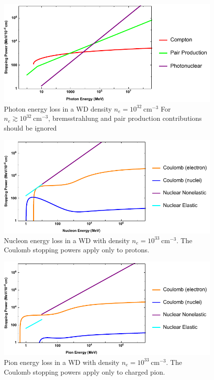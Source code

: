 \documentclass[twocolumn,showpacs,preprintnumbers,amsmath,amssymb,prd]{revtex4}
\begin{document}
\begin{appendices}
\begin{figure}
\label{fig:SPelectron}
\end{figure}
\begin{figure}
\includegraphics[scale=.45]{SPphoton.pdf}
\caption{Photon energy loss in a WD density $n_e = 10^{32} ~\text{cm}^{-3}$ For $n_e \gtrsim 10^{32} ~\text{cm}^{-3}$, bremsstrahlung and pair production contributions should be ignored}
\label{fig:SPphoton}
\end{figure}
\begin{figure}
\includegraphics[scale=.45]{SPnucleon.pdf}
\caption{Nucleon energy loss in a WD with density $n_e = 10^{33} ~\text{cm}^{-3}$. The Coulomb stopping powers apply only to protons.}
\label{fig:SPnuc}
\end{figure}
\begin{figure}
\includegraphics[scale=.45]{SPpion.pdf}
\caption{Pion energy loss in a WD with density $n_e = 10^{33} ~\text{cm}^{-3}$. The Coulomb stopping powers apply only to charged pion.}
\label{fig:SPpion}
\end{figure}


\end{appendices}
\end{document}

